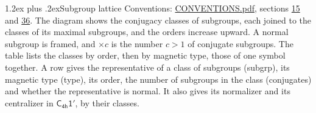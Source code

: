 \documentclass[10pt,a4paper]{article}
\makeatletter
\renewcommand\section{\@startsection{section}{1}{\z@}{-3ex plus -1ex minus -.2ex}%
  {1.2ex plus .2ex}{\normalfont\large\sffamily\bfseries\color{parttitle}}}
\numberwithin{equation}{section}
\newcommand{\grp}[1]{\mathsf{#1}}
\makeatother
\begin{document}
\section{Subgroup lattice}\label{s:subgroups}
Conventions: \href{../../CONVENTIONS.pdf}{CONVENTIONS.pdf}, sections \href{../../../rotation/CONVENTIONS.pdf\#conv.15}{15} and \href{../../CONVENTIONS.pdf\#conv.36}{36}.
The diagram shows the conjugacy classes of subgroups, each joined to the classes of its maximal subgroups, and the orders increase upward. \label{n:index.conjugates.c}A normal subgroup is framed, and ${\times}c$ is the number $c > 1$ of conjugate subgroups. The table lists the classes by order, then by magnetic type, those of one symbol together. \label{n:head.subgroup}\label{n:head.magnetic.type}\label{n:head.order}\label{n:head.conjugates}\label{n:head.normal}A row gives the representative of a class of subgroups (subgrp), its magnetic type (type), its order, the number of subgroups in the class (conjugates) and whether the representative is normal. \label{n:head.normalizer}\label{n:head.centralizer}It also gives its normalizer and its centralizer in $\grp{C_{4h}1'}$, by their classes. 
\end{document}
